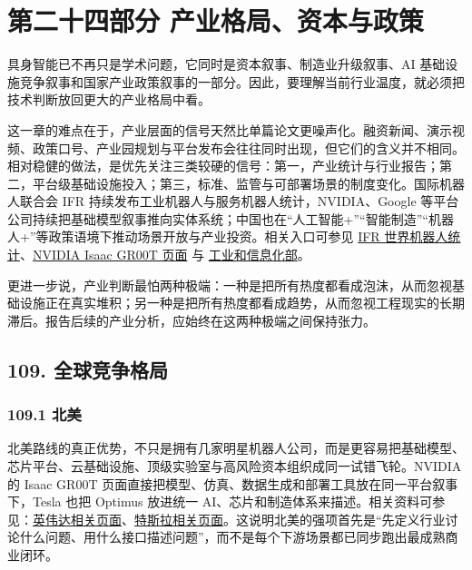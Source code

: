 
\part*{第二十四部分 产业格局、资本与政策}

具身智能已不再只是学术问题，它同时是资本叙事、制造业升级叙事、AI 基础设施竞争叙事和国家产业政策叙事的一部分。因此，要理解当前行业温度，就必须把技术判断放回更大的产业格局中看。

这一章的难点在于，产业层面的信号天然比单篇论文更噪声化。融资新闻、演示视频、政策口号、产业园规划与平台发布会往往同时出现，但它们的含义并不相同。相对稳健的做法，是优先关注三类较硬的信号：第一，产业统计与行业报告；第二，平台级基础设施投入；第三，标准、监管与可部署场景的制度变化。国际机器人联合会 IFR 持续发布工业机器人与服务机器人统计，NVIDIA、Google 等平台公司持续把基础模型叙事推向实体系统；中国也在“人工智能+”“智能制造”“机器人+”等政策语境下推动场景开放与产业投资。相关入口可参见 \href{https://ifr.org/worldrobotics/}{IFR 世界机器人统计}、\href{https://developer.nvidia.com/isaac/gr00t}{NVIDIA Isaac GR00T 页面} 与 \href{https://www.miit.gov.cn/}{工业和信息化部}。

更进一步说，产业判断最怕两种极端：一种是把所有热度都看成泡沫，从而忽视基础设施正在真实堆积；另一种是把所有热度都看成趋势，从而忽视工程现实的长期滞后。报告后续的产业分析，应始终在这两种极端之间保持张力。

\chapter*{109. 全球竞争格局}

\section*{109.1 北美}


北美路线的真正优势，不只是拥有几家明星机器人公司，而是更容易把基础模型、芯片平台、云基础设施、顶级实验室与高风险资本组织成同一试错飞轮。NVIDIA 的 Isaac GR00T 页面直接把模型、仿真、数据生成和部署工具放在同一平台叙事下，Tesla 也把 Optimus 放进统一 AI、芯片和制造体系来描述。相关资料可参见：\href{https://developer.nvidia.com/isaac/gr00t}{英伟达相关页面}、\href{https://www.tesla.com/AI}{特斯拉相关页面}。这说明北美的强项首先是“先定义行业讨论什么问题、用什么接口描述问题”，而不是每个下游场景都已同步跑出最成熟商业闭环。

